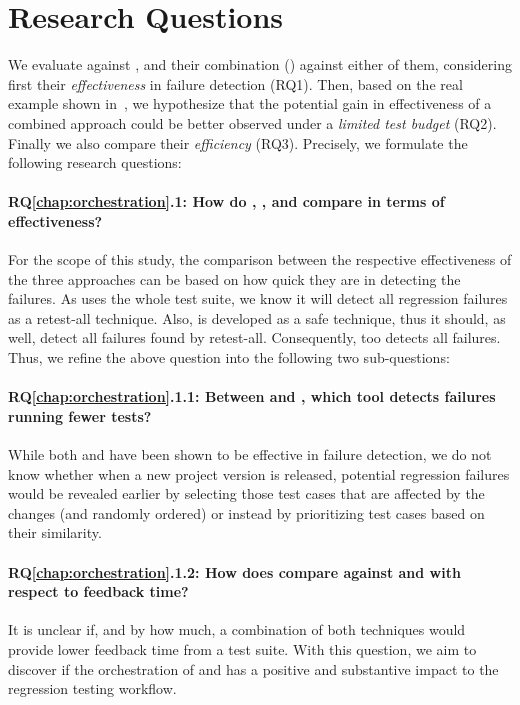 \section{Research Questions}\label{sec:orch_rqs}

We evaluate \ek against \fs, and their combination (\fz) against either of them, considering first  their \textit{effectiveness} in  failure detection  (RQ1). Then, based on the real example shown in~, we hypothesize that the potential gain in effectiveness of a combined approach could be better observed under a \textit{limited test budget} (RQ2). Finally we also compare their \textit{efficiency} (RQ3). Precisely,  we formulate the following research questions:

\paragraph{RQ\ref{chap:orchestration}.1: How do \ek, \fs, and \fz compare in terms of effectiveness?}
For the scope of this study, the comparison between the respective effectiveness of the three approaches can be based on how quick they are in detecting the failures.  As \fs uses the whole test suite, we know it will detect all regression failures as a retest-all technique.
Also, \ek is developed as a safe \tcs technique, thus it should, as well, detect all failures found by retest-all.
Consequently, \fz too detects all failures.
Thus, we refine the above question into the following two sub-questions:

\paragraph{RQ\ref{chap:orchestration}.1.1: Between \ek and \fs, which tool detects failures running fewer tests?}
While both \ek and \fs have been shown to be effective in failure  detection,  we do not  know whether when a new project version is released, potential regression failures would be revealed earlier by selecting those test cases that are affected by the changes (and randomly ordered) or instead by prioritizing test cases based on their similarity. 

\paragraph{RQ\ref{chap:orchestration}.1.2: How does \fz compare against \ek and \fs with respect to feedback time?} 
It is unclear if, and by how much, a combination of both techniques would provide lower feedback time from a test suite.
With this question, we aim to discover if the orchestration of \tcs and \tcp has a positive and substantive impact to the regression testing workflow.

